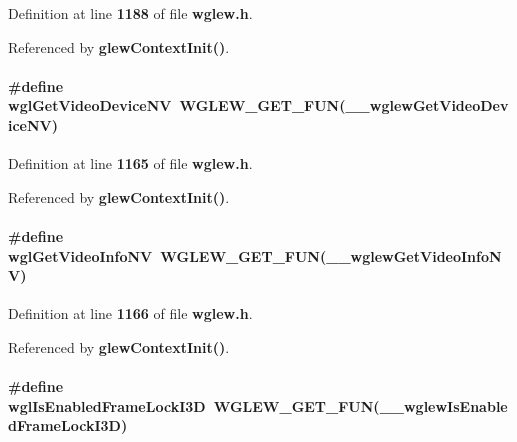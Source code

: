Definition at line {\bf 1188} of file {\bf wglew.\+h}.



Referenced by {\bf glew\+Context\+Init()}.

\paragraph[{wgl\+Get\+Video\+Device\+NV}]{\setlength{\rightskip}{0pt plus 5cm}\#define wgl\+Get\+Video\+Device\+NV~{\bf W\+G\+L\+E\+W\+\_\+\+G\+E\+T\+\_\+\+F\+UN}({\bf \+\_\+\+\_\+wglew\+Get\+Video\+Device\+NV})}\label{wglew_8h_a165a2e5cae38f0bd06c228f9ee666278}


Definition at line {\bf 1165} of file {\bf wglew.\+h}.



Referenced by {\bf glew\+Context\+Init()}.

\paragraph[{wgl\+Get\+Video\+Info\+NV}]{\setlength{\rightskip}{0pt plus 5cm}\#define wgl\+Get\+Video\+Info\+NV~{\bf W\+G\+L\+E\+W\+\_\+\+G\+E\+T\+\_\+\+F\+UN}({\bf \+\_\+\+\_\+wglew\+Get\+Video\+Info\+NV})}\label{wglew_8h_a9088f2995563970c07ec2520cc33b0b6}


Definition at line {\bf 1166} of file {\bf wglew.\+h}.



Referenced by {\bf glew\+Context\+Init()}.

\paragraph[{wgl\+Is\+Enabled\+Frame\+Lock\+I3D}]{\setlength{\rightskip}{0pt plus 5cm}\#define wgl\+Is\+Enabled\+Frame\+Lock\+I3D~{\bf W\+G\+L\+E\+W\+\_\+\+G\+E\+T\+\_\+\+F\+UN}({\bf \+\_\+\+\_\+wglew\+Is\+Enabled\+Frame\+Lock\+I3D})}\label{wglew_8h_a085bf427725a0fb0442afac0fee4c86b}


